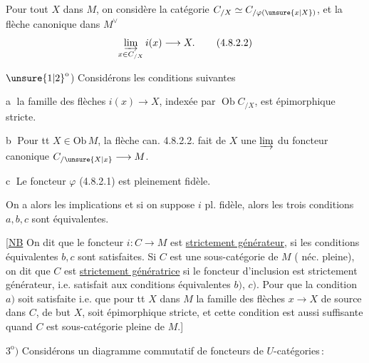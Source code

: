 Pour tout $X$ dans $M$, on considère la
 catégorie $C_{/X}\simeq C_{/\varphi(\unsure{x|X})}$, et la flèche
canonique dans  $M^\vee$
\[
\varinjlim_{x\in C_{/X}} i(x)\longrightarrow X\mathpunct{.}
\tag*{(4.8.2.2)}
\]

$\unsure{1|2}^{\mathrm{o}}$) Considérons les conditions suivantes

\textcircled{a}  la famille des flèches $i(x)\longrightarrow X$, indexée
par $\operatorname{Ob}C_{/X}$, est épimorphique stricte.

\textcircled{b} Pour tt $X\in\mathrm{Ob}\,M$, la flèche can. 4.8.2.2.
 fait de $X$ une $\varinjlim$ du foncteur
canonique $C_{/\unsure{X|x}}\longrightarrow M$.

\textcircled{c} Le foncteur $\varphi$ (4.8.2.1) est pleinement
fidèle.

On a alors les implications
et si on suppose $i$ pl. fidèle, alors les
trois conditions $a,b,c$ sont équivalentes.

[\uline{NB} On dit que le foncteur $i:C\longrightarrow M$
est \uline{strictement générateur}, si les conditions
équivalentes $b,c$ sont satisfaites. Si $C$ est
une sous-catégorie de $M$ ( néc. pleine),
on dit que $C$ est \uline{strictement génératrice}
si le foncteur d'inclusion est strictement
générateur, i.e. satisfait aux conditions
équivalentes $b)$, $c)$. Pour 
que la condition $a)$ soit satisfaite i.e.
que pour tt $X$ dans $M$ la famille
des flèches $x\longrightarrow X$ de source dans
$C$, de but $X$, soit épimorphique stricte,
et cette condition est aussi suffisante
quand $C$ est sous-catégorie pleine de $M$.]

$3^{\mathrm o})$ Considérons un diagramme commutatif
de foncteurs de $U$-catégories\,:
